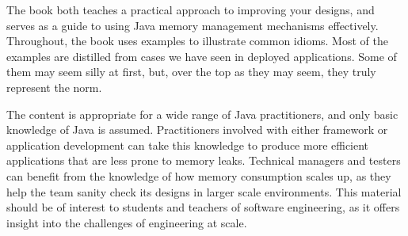 The book both teaches a practical approach to improving your designs, and  
serves as a guide to using Java memory management mechanisms effectively.
Throughout, the book uses examples to illustrate common
idioms. Most of the examples are distilled from cases we have
seen in deployed applications. Some of them may seem silly at first, but, over
the top as they may seem, they truly represent the norm. 


The content is appropriate for a wide range of Java practitioners, and only
basic knowledge of Java is assumed.
Practitioners involved with either framework or application development can
take this knowledge to produce more efficient applications that are less prone to
memory leaks.
Technical managers and testers can benefit from the knowledge of how memory
consumption scales up, as they help the team sanity check its designs in larger
scale environments.
This material should be of interest to students and teachers of software
engineering, as it offers insight into the challenges of engineering at scale.

